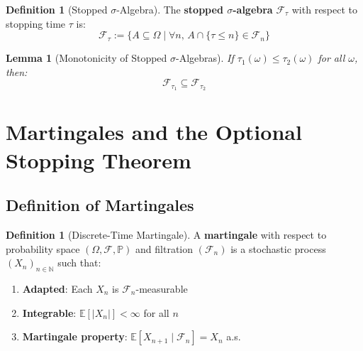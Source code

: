 \documentclass[11pt,a4paper]{article}
\theoremstyle{plain}
\newtheorem{lemma}[theorem]{Lemma}
\theoremstyle{definition}
\newtheorem{definition}[theorem]{Definition}
\newcommand{\NN}{\mathbb{N}}
\newcommand{\FF}{\mathcal{F}}
\newcommand{\PP}{\mathbb{P}}
\newcommand{\EE}{\mathbb{E}}
\begin{document}
\begin{definition}[Stopped $\sigma$-Algebra]
\label{def:stopped-sigma-algebra}
The \textbf{stopped $\sigma$-algebra} $\FF_\tau$ with respect to 
stopping time $\tau$ is:
\[
  \FF_\tau := \{A \subseteq \Omega \mid \forall n,\, A \cap \{\tau \leq n\} \in \FF_n\}
\]
\end{definition}

\begin{lemma}[Monotonicity of Stopped $\sigma$-Algebras]
\label{lem:stopped-sigma-monotone}
If $\tau_1(\omega) \leq \tau_2(\omega)$ for all $\omega$, then:
\[
  \FF_{\tau_1} \subseteq \FF_{\tau_2}
\]
\end{lemma}

\section{Martingales and the Optional Stopping Theorem}
\label{sec:martingale}

\subsection{Definition of Martingales}

\begin{definition}[Discrete-Time Martingale]
\label{def:martingale}
A \textbf{martingale} with respect to probability space $(\Omega, \FF, \PP)$ 
and filtration $(\FF_n)$ is a stochastic process $(X_n)_{n \in \NN}$ such that:
\begin{enumerate}[label=(\arabic*)]
  \item \textbf{Adapted}: Each $X_n$ is $\FF_n$-measurable
  \item \textbf{Integrable}: $\EE[|X_n|] < \infty$ for all $n$
  \item \textbf{Martingale property}: $\EE[X_{n+1} \mid \FF_n] = X_n$ a.s.
\end{enumerate}
\end{definition}
\end{document}
